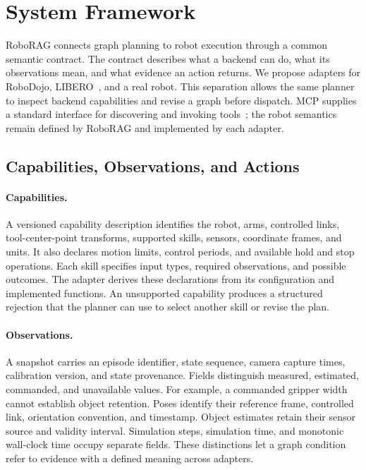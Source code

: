 \section{System Framework}
\label{sec:system}

RoboRAG connects graph planning to robot execution through a common semantic contract. The contract describes what a backend can do, what its observations mean, and what evidence an action returns. We propose adapters for RoboDojo, LIBERO~\cite{libero2023}, and a real robot. This separation allows the same planner to inspect backend capabilities and revise a graph before dispatch. MCP supplies a standard interface for discovering and invoking tools~\cite{mcp2026}; the robot semantics remain defined by RoboRAG and implemented by each adapter.

\subsection{Capabilities, Observations, and Actions}

\paragraph{Capabilities.}
A versioned capability description identifies the robot, arms, controlled links, tool-center-point transforms, supported skills, sensors, coordinate frames, and units. It also declares motion limits, control periods, and available hold and stop operations. Each skill specifies input types, required observations, and possible outcomes. The adapter derives these declarations from its configuration and implemented functions. An unsupported capability produces a structured rejection that the planner can use to select another skill or revise the plan.

\paragraph{Observations.}
A snapshot carries an episode identifier, state sequence, camera capture times, calibration version, and state provenance. Fields distinguish measured, estimated, commanded, and unavailable values. For example, a commanded gripper width cannot establish object retention. Poses identify their reference frame, controlled link, orientation convention, and timestamp. Object estimates retain their sensor source and validity interval. Simulation steps, simulation time, and monotonic wall-clock time occupy separate fields. These distinctions let a graph condition refer to evidence with a defined meaning across adapters.

